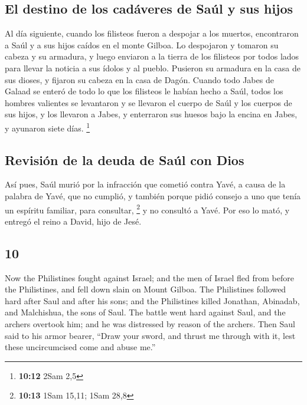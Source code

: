 \begin{paracol}{2}
\hypertarget{el-destino-de-los-caduxe1veres-de-sauxfal-y-sus-hijos}{%
\subsection{El destino de los cadáveres de Saúl y sus
hijos}\label{el-destino-de-los-caduxe1veres-de-sauxfal-y-sus-hijos}}

 Al día siguiente, cuando los filisteos fueron a despojar
a los muertos, encontraron a Saúl y a sus hijos caídos en el monte
Gilboa.  Lo despojaron y tomaron su cabeza y su armadura,
y luego enviaron a la tierra de los filisteos por todos lados para
llevar la noticia a sus ídolos y al pueblo.  Pusieron su
armadura en la casa de sus dioses, y fijaron su cabeza en la casa de
Dagón.  Cuando todo Jabes de Galaad se enteró de todo lo
que los filisteos le habían hecho a Saúl,  todos los
hombres valientes se levantaron y se llevaron el cuerpo de Saúl y los
cuerpos de sus hijos, y los llevaron a Jabes, y enterraron sus huesos
bajo la encina en Jabes, y ayunaron siete días. \footnote{\textbf{10:12}
  2Sam 2,5}

\hypertarget{revisiuxf3n-de-la-deuda-de-sauxfal-con-dios}{%
\subsection{Revisión de la deuda de Saúl con
Dios}\label{revisiuxf3n-de-la-deuda-de-sauxfal-con-dios}}

 Así pues, Saúl murió por la infracción que cometió
contra Yavé, a causa de la palabra de Yavé, que no cumplió, y también
porque pidió consejo a uno que tenía un espíritu familiar, para
consultar, \footnote{\textbf{10:13} 1Sam 15,11; 1Sam 28,8}
 y no consultó a Yavé. Por eso lo mató, y entregó el
reino a David, hijo de Jesé.

\switchcolumn
\begin{otherlanguage}{english}

\hypertarget{section-19}{%
\section{10}\label{section-19}}

 Now the Philistines fought against Israel; and the men of
Israel fled from before the Philistines, and fell down slain on Mount
Gilboa.  The Philistines followed hard after Saul and
after his sons; and the Philistines killed Jonathan, Abinadab, and
Malchishua, the sons of Saul.  The battle went hard
against Saul, and the archers overtook him; and he was distressed by
reason of the archers.  Then Saul said to his armor
bearer, ``Draw your sword, and thrust me through with it, lest these
uncircumcised come and abuse me.''


\end{otherlanguage}
\end{paracol}
